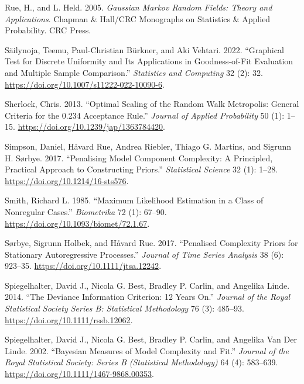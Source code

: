 \documentclass[
  11pt,
  letterpaper,
]{scrbook}
\newlength{\cslhangindent}
\newenvironment{CSLReferences}[2] %
 {\begin{list}{}{%
  \setlength{\itemindent}{0pt}
  \setlength{\leftmargin}{0pt}
  \setlength{\parsep}{0pt}
  \ifodd #1
   \setlength{\leftmargin}{\cslhangindent}
   \setlength{\itemindent}{-1\cslhangindent}
  \fi
  \setlength{\itemsep}{#2\baselineskip}}}
 {\end{list}}
\theoremstyle{definition}
\theoremstyle{plain}
\theoremstyle{plain}
\theoremstyle{plain}
\theoremstyle{definition}
\theoremstyle{definition}
\theoremstyle{plain}
\theoremstyle{plain}
\theoremstyle{remark}
\begin{document}
\begin{CSLReferences}{1}{1}
Rue, H., and L. Held. 2005. \emph{{G}aussian {M}arkov Random Fields:
Theory and Applications}. Chapman \& Hall/CRC Monographs on Statistics
\& Applied Probability. CRC Press.

Säilynoja, Teemu, Paul-Christian Bürkner, and Aki Vehtari. 2022.
{``Graphical Test for Discrete Uniformity and Its Applications in
Goodness-of-Fit Evaluation and Multiple Sample Comparison.''}
\emph{Statistics and Computing} 32 (2): 32.
\url{https://doi.org/10.1007/s11222-022-10090-6}.

Sherlock, Chris. 2013. {``Optimal Scaling of the Random Walk
{M}etropolis: General Criteria for the 0.234 Acceptance Rule.''}
\emph{Journal of Applied Probability} 50 (1): 1--15.
\url{https://doi.org/10.1239/jap/1363784420}.

Simpson, Daniel, Håvard Rue, Andrea Riebler, Thiago G. Martins, and
Sigrunn H. Sørbye. 2017. {``Penalising Model Component Complexity: A
Principled, Practical Approach to Constructing Priors.''}
\emph{Statistical Science} 32 (1): 1--28.
\url{https://doi.org/10.1214/16-sts576}.

Smith, Richard L. 1985. {``Maximum Likelihood Estimation in a Class of
Nonregular Cases.''} \emph{Biometrika} 72 (1): 67--90.
\url{https://doi.org/10.1093/biomet/72.1.67}.

Sørbye, Sigrunn Holbek, and Håvard Rue. 2017. {``Penalised Complexity
Priors for Stationary Autoregressive Processes.''} \emph{Journal of Time
Series Analysis} 38 (6): 923--35.
\url{https://doi.org/10.1111/jtsa.12242}.

Spiegelhalter, David J., Nicola G. Best, Bradley P. Carlin, and Angelika
Linde. 2014. {``The Deviance Information Criterion: 12 Years On.''}
\emph{Journal of the Royal Statistical Society Series B: Statistical
Methodology} 76 (3): 485--93. \url{https://doi.org/10.1111/rssb.12062}.

Spiegelhalter, David J., Nicola G. Best, Bradley P. Carlin, and Angelika
Van Der Linde. 2002. {``Bayesian Measures of Model Complexity and
Fit.''} \emph{Journal of the Royal Statistical Society: Series B
(Statistical Methodology)} 64 (4): 583--639.
\url{https://doi.org/10.1111/1467-9868.00353}.


\end{CSLReferences}
\end{document}
